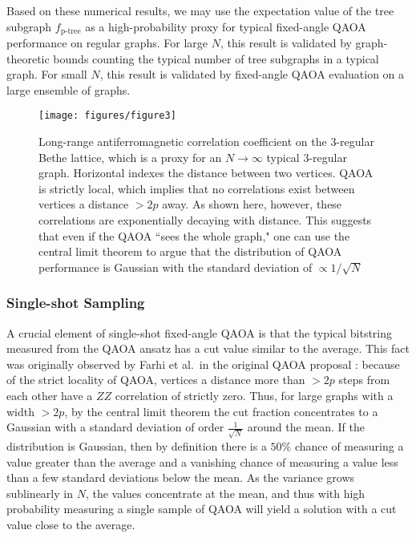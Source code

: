\documentclass[prb,reprint,nofootinbib,longbibliography,superscriptaddress]{revtex4-1}
\begin{document}
Based on these numerical results, we may use the expectation value of the tree subgraph $f_\text{p-tree}$ as a high-probability proxy for typical fixed-angle QAOA performance on regular graphs. For large $N$, this result is validated by graph-theoretic bounds counting the typical number of tree subgraphs in a typical graph. For small $N$, this result is validated by fixed-angle QAOA evaluation on a large ensemble of graphs.

\begin{figure}
    \centering
    \texttt{[image: figures/figure3]}
    \caption{Long-range antiferromagnetic correlation coefficient on the 3-regular Bethe lattice, which is a proxy for an $N\to\infty$ typical 3-regular graph. Horizontal indexes the distance between two vertices.  QAOA is strictly local, which implies that  no correlations exist between vertices a distance $>2p$ away. As shown here, however, these correlations are exponentially decaying with distance. This suggests that even if the QAOA ``sees the whole graph," one can use the central limit theorem to argue that the distribution of QAOA performance is  Gaussian with the standard deviation of $\propto 1/\sqrt N$}
    \label{fig:longrange_correlations}
\end{figure}

\subsubsection{Single-shot Sampling}
\label{sec:single-shot}

A crucial element of single-shot fixed-angle QAOA is  that the typical bitstring measured from the QAOA ansatz has a cut value similar to the average. This fact was originally observed by Farhi et al.~in the original QAOA proposal \cite{farhi2014quantum}: because of the strict locality of QAOA, vertices a distance more than $>2p$ steps from each other have a $ZZ$ correlation of strictly zero. Thus, for large graphs with a width $>2p$, by the central limit theorem the cut fraction concentrates to a Gaussian with a standard deviation of order $\frac{1}{\sqrt{N}}$ around the mean. If the distribution is Gaussian, then by definition there is a $50\%$ chance of measuring a value greater than the average and a vanishing chance of measuring a value less than a few standard deviations below the mean. As the variance grows sublinearly in $N$, the values concentrate at the mean, and thus with high probability measuring a single sample of QAOA will yield a solution with a cut value close to the average.
\end{document}
